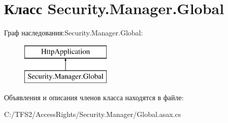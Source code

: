 \hypertarget{class_security_1_1_manager_1_1_global}{}\section{Класс Security.\+Manager.\+Global}
\label{class_security_1_1_manager_1_1_global}
Граф наследования\+:Security.\+Manager.\+Global\+:\begin{figure}[H]
\begin{center}
\leavevmode
\includegraphics[height=2.000000cm]{dc/de5/class_security_1_1_manager_1_1_global}
\end{center}
\end{figure}


Объявления и описания членов класса находятся в файле\+:\begin{DoxyCompactItemize}
\item 
C\+:/\+T\+F\+S2/\+Access\+Rights/\+Security.\+Manager/Global.\+asax.\+cs\end{DoxyCompactItemize}
